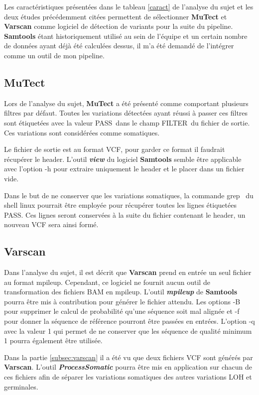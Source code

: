 Les caractéristiques présentées dans le tableau \ref{caract} de l'analyse du sujet et les deux études précédemment citées permettent de sélectionner \textbf{MuTect} et \textbf{Varscan} comme logiciel de détection de variants pour la suite du pipeline. \textbf{Samtools} étant historiquement utilisé au sein de l'équipe et un certain nombre de données ayant déjà été calculées dessus, il m'a été demandé de l'intégrer comme un outil de mon pipeline.

\subsection{MuTect}

Lors de l'analyse du sujet, \textbf{MuTect} a été présenté comme comportant plusieurs filtres par défaut. Toutes les variations détectées ayant réussi à passer ces filtres sont étiquetées avec la valeur \og PASS\fg ~dans le champ \og FILTER\fg ~du fichier de sortie. Ces variations sont considérées comme somatiques. 

Le fichier de sortie est au format VCF, pour garder ce format il faudrait récupérer le header. L'outil \textit{\textbf{view}} du logiciel \textbf{Samtools} semble être applicable avec l'option -h pour extraire uniquement le header et le placer dans un fichier vide.

Dans le but de ne conserver que les variations somatiques, la commande \og grep \fg ~du shell linux pourrait être employée pour récupérer toutes les lignes étiquetées \og PASS\fg. Ces lignes seront conservées à la suite du fichier contenant le header, un nouveau VCF sera ainsi formé.

\subsection{Varscan}

Dans l'analyse du sujet, il est décrit que \textbf{Varscan} prend en entrée un seul fichier au format mpileup. Cependant, ce logiciel ne fournit aucun outil de transformation des fichiers BAM en mpileup. L'outil \textit{\textbf{mpileup}} de \textbf{Samtools} pourra être mis à contribution pour générer le fichier attendu. Les options -B pour supprimer le calcul de probabilité qu'une séquence soit mal alignée et -f pour donner la séquence de référence pourront être passées en entrées. L'option -q avec la valeur 1 qui permet de ne conserver que les séquence de qualité minimum 1 pourra également être utilisée.

Dans la partie \ref{subsec:varscan} il a été vu que deux fichiers VCF sont générés par \textbf{Varscan}. L'outil \textit{\textbf{ProcessSomatic}} pourra être mis en application sur chacun de ces fichiers afin de séparer les variations somatiques des autres variations LOH et germinales.

